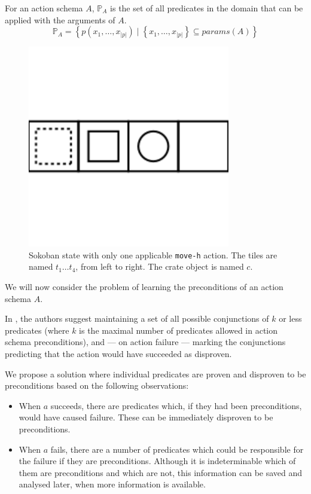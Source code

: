 \documentclass[../Master.tex]{subfiles}
\begin{document}
For an action schema $A$, $\mathbb{P}_A$ is the set of all predicates in the domain that can be applied with the arguments of $A$.
\[
    \mathbb{P}_A = \left\{
        p \left( x_1, \dots, x_{|p|} \right)
        \; | \; \left\{ x_1, \dots, x_{|p|} \right\} \subseteq params(A)
    \right\}
\]

\begin{figure}
    \centering
    \includegraphics[scale=0.7]{../Graphics/sokoSmall}
    \caption{\label{fig:sokoSmall} Sokoban state with only one applicable \texttt{move-h} action. The tiles are named $t_1 \dots t_4$, from left to right. The crate object is named $c$.}
\end{figure}

We will now consider the problem of learning the preconditions of an action schema $A$.

In \cite{Walsh2008}, the authors suggest maintaining a set of all possible conjunctions of $k$ or less predicates (where $k$ is the maximal number of predicates allowed in action schema preconditions), and --- on action failure --- marking the conjunctions predicting that the action would have succeeded as disproven.

We propose a solution where individual predicates are proven and disproven to be preconditions based on the following observations:
\begin{itemize}
    \item When $a$ succeeds, there are predicates which, if they had been preconditions, would have caused failure. These can be immediately disproven to be preconditions.
    \item When $a$ fails, there are a number of predicates which could be responsible for the failure if they are preconditions. Although it is indeterminable which of them are preconditions and which are not, this information can be saved and analysed later, when more information is available.
\end{itemize}
\end{document}
